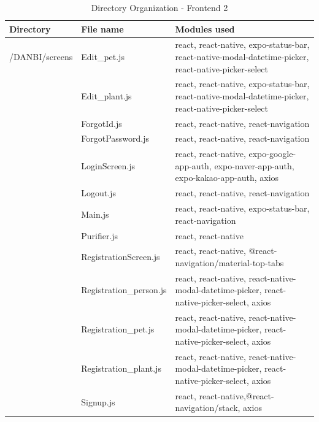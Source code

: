 \documentclass[conference]{IEEEtran}
\begin{document}
\begin{table}[h!]

\begin{threeparttable}
    \caption{Directory Organization - Frontend 2%
    \label{tab:table5}}    %
    \begin{tabular}{p{2.4cm}p{2.8cm}p{2cm}}
    \toprule
    \bfseries Directory & \bfseries File name & \multicolumn{1}{l}{\bfseries Modules used} \\
    \midrule
    /DANBI/screens
     & Edit\_pet.js& react, react-native, expo-status-bar, react-native-modal-datetime-picker, react-native-picker-select\\
            & Edit\_plant.js& react, react-native, expo-status-bar, react-native-modal-datetime-picker, react-native-picker-select\\
            & ForgotId.js& react, react-native, react-navigation\\
            & ForgotPassword.js& react, react-native, react-navigation\\
            & LoginScreen.js& react, react-native, expo-google-app-auth, expo-naver-app-auth, expo-kakao-app-auth, axios\\
            & Logout.js& react, react-native, react-navigation\\
            & Main.js& react, react-native, expo-status-bar, react-navigation\\
             & Purifier.js& react, react-native\\
            & RegistrationScreen.js& react, react-native, @react-navigation/material-top-tabs\\
            & Registration\_person.js& react, react-native, react-native-modal-datetime-picker, react-native-picker-select, axios\\
            & Registration\_pet.js& react, react-native, react-native-modal-datetime-picker, react-native-picker-select, axios\\
            & Registration\_plant.js& react, react-native, react-native-modal-datetime-picker, react-native-picker-select, axios\\
            & Signup.js& react, react-native,@react-navigation/stack, axios\\
    \bottomrule
    \end{tabular}
\end{threeparttable}
\end{table}
\end{document}
